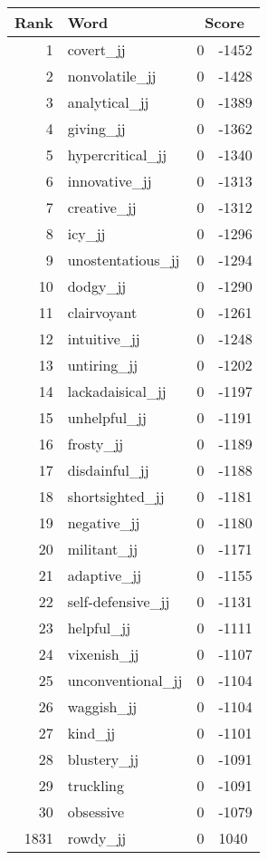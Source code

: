 \begin{longtable}[!htbp]{| rlr@{.}l |}
    \hline
    \textbf{Rank} & \textbf{Word} & \multicolumn{2}{c|}{\textbf{Score}} \\
    \hline
    \endhead
    1 & covert\_jj & 0 & -1452 \\
    2 & nonvolatile\_jj & 0 & -1428 \\
    3 & analytical\_jj & 0 & -1389 \\
    4 & giving\_jj & 0 & -1362 \\
    5 & hypercritical\_jj & 0 & -1340 \\
    6 & innovative\_jj & 0 & -1313 \\
    7 & creative\_jj & 0 & -1312 \\
    8 & icy\_jj & 0 & -1296 \\
    9 & unostentatious\_jj & 0 & -1294 \\
    10 & dodgy\_jj & 0 & -1290 \\
    11 & clairvoyant & 0 & -1261 \\
    12 & intuitive\_jj & 0 & -1248 \\
    13 & untiring\_jj & 0 & -1202 \\
    14 & lackadaisical\_jj & 0 & -1197 \\
    15 & unhelpful\_jj & 0 & -1191 \\
    16 & frosty\_jj & 0 & -1189 \\
    17 & disdainful\_jj & 0 & -1188 \\
    18 & shortsighted\_jj & 0 & -1181 \\
    19 & negative\_jj & 0 & -1180 \\
    20 & militant\_jj & 0 & -1171 \\
    21 & adaptive\_jj & 0 & -1155 \\
    22 & self-defensive\_jj & 0 & -1131 \\
    23 & helpful\_jj & 0 & -1111 \\
    24 & vixenish\_jj & 0 & -1107 \\
    25 & unconventional\_jj & 0 & -1104 \\
    26 & waggish\_jj & 0 & -1104 \\
    27 & kind\_jj & 0 & -1101 \\
    28 & blustery\_jj & 0 & -1091 \\
    29 & truckling & 0 & -1091 \\
    30 & obsessive & 0 & -1079 \\
    1831 & rowdy\_jj & 0 & 1040 \\

\end{longtable}
